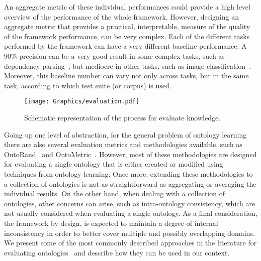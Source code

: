     An aggregate metric of these individual performances could provide a high level
    overview of the performance of the whole framework.
    However, designing an aggregate metric that provides a practical, interpretable,
    measure of the quality of the framework performance, can be very complex.
    Each of the different tasks performed by the framework can have a very different
    baseline performance. A 90\% precision can be a very good result
    in some complex tasks, such as dependency parsing~\cite{AlbertiABCGKKMO17}, but mediocre in other tasks, such
    as image classification~\cite{Russakovsky2015}. Moreover, this baseline number can
    vary not only across tasks, but in the same task, according to which test suite (or corpus)
    is used.

    \begin{figure}[htb]
    	\begin{center}
        	\texttt{[image: Graphics/evaluation.pdf]}
            \caption{Schematic representation of the process for evaluate knowledge.}
            \label{fig:evaluation}
        \end{center}
    \end{figure}
    
	Going up one level of abstraction, for the general problem of ontology learning there are also
    several evaluation metrics and methodologies available, such as OntoRand~\cite{ontorand} 
    and OntoMetric~\cite{ontometric}. However, most of these
    methodologies are designed for evaluating a single ontology that is either created or
    modified using techniques from ontology learning. Once more, extending these methodologies
    to a collection of ontologies is not as straightforward as aggregating or averaging
    the individual results. On the other hand, when dealing with a collection of ontologies,
    other concerns can arise, such as intra-ontology consistency, which are not usually
    considered when evaluating a single ontology. As a final consideration, the framework
    by design, is expected to maintain a degree of internal inconsistency in order
    to better cover multiple and possibly overlapping domains.
    We present some of the most commonly described approaches in the literature for 
    evaluating ontologies~\cite{petasis2011ontology}
    and describe how they can be used in our context.

